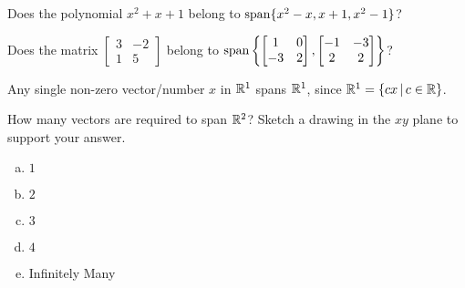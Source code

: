 \begin{activity}{5}
  Does the polynomial  \(x^2+x+1\) belong to
  \(\operatorname{span}\{x^2-x,x+1, x^2-1\}\)?
\end{activity}

\begin{activity}{5}
  Does the matrix \(\begin{bmatrix}3&-2\\1&5\end{bmatrix}\) belong to
  \(\operatorname{span}\left\{\begin{bmatrix}1&0\\-3&2\end{bmatrix},
  \begin{bmatrix}-1&-3\\2&2\end{bmatrix}\right\}\)?
\end{activity}



\begin{observation}
Any single non-zero vector/number \(x\) in \(\mathbb{R}^1\) spans \(\mathbb{R}^1\),
since \(\mathbb{R}^1=\left\{cx\,\middle|\,c\in\mathbb{R}\right\}\).

\begin{center}
\end{center}
\end{observation}


\begin{activity}{5}
  How many vectors are required to span \(\mathbb{R}^2\)?
  Sketch a drawing in the \(xy\) plane to support your answer.
  \begin{center}
  \end{center}
  
  \begin{enumerate}[(a)]
  \item $1$
  \item $2$
  \item $3$
  \item $4$
  \item Infinitely Many
  \end{enumerate}
\end{activity}

